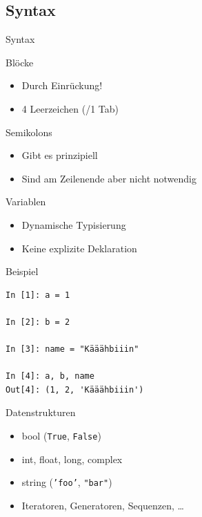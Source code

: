 \subsection{Syntax}
\begin{frame}{Syntax}
  \begin{block}{Blöcke}
    \begin{itemize}
      \item Durch Einrückung!
      \item 4 Leerzeichen (/1 Tab)
    \end{itemize}
  \end{block}
  \begin{block}{Semikolons}
  \begin{itemize}
    \item Gibt es prinzipiell
    \item Sind am Zeilenende aber nicht notwendig
  \end{itemize}
  \end{block}
\end{frame}

\begin{frame}[fragile]{Variablen}
  \begin{itemize}
    \item Dynamische Typisierung
    \item Keine explizite Deklaration 
  \end{itemize}
  \begin{spacing}{1.0}
    \begin{exampleblock}{Beispiel}
      \begin{verbatim}
In [1]: a = 1

In [2]: b = 2

In [3]: name = "Kääähbiiin"

In [4]: a, b, name
Out[4]: (1, 2, 'Kääähbiiin')
      \end{verbatim}
    \end{exampleblock}
  \end{spacing}  
\end{frame}

\begin{frame}{Datenstrukturen}
  \begin{itemize}
    \item bool (\texttt{True}, \texttt{False})
    \item int, float, long, complex
    \item string (\texttt{'foo'}, \texttt{"bar"})
    \item Iteratoren, Generatoren, Sequenzen, …
  \end{itemize}
\end{frame}

